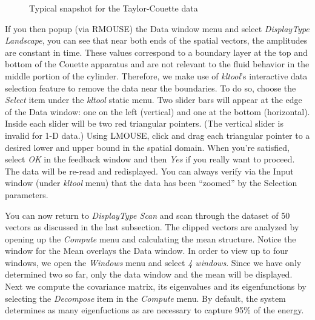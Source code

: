 \begin{figure}
\caption{Typical snapshot for the Taylor-Couette data}
\label{fig:ct}
\end{figure}

If you then popup (via RMOUSE) the Data window menu and select 
{\sl DisplayType Landscape},
you can see  that near both ends of the spatial vectors,
the amplitudes are constant in time.
These values correspond to a boundary layer at the top and 
bottom of the Couette apparatus and are
not relevant to the fluid behavior in the middle portion of the cylinder.
Therefore, we make use of {\sl kltool}'s interactive data selection feature to
remove the data near the boundaries. To do so, 
choose the {\sl Select} item under the {\sl kltool} static menu.
Two slider bars will appear
at the edge of the Data window: one on the left (vertical) and one 
at the bottom (horizontal).
Inside each slider will be two red triangular pointers.  
(The vertical slider is invalid for 1-D data.)
Using LMOUSE, click and drag each triangular pointer to a desired
lower and upper bound in the spatial domain.  When you're satisfied, select
{\sl OK} in the feedback window and then {\sl Yes}
if you really want to proceed.
The data will be re-read and redisplayed.  You can always verify via the
Input window (under {\sl kltool} menu) that the data has been ``zoomed'' by
the Selection parameters.

You can now return to {\sl DisplayType Scan} and
scan through the dataset of 50 vectors as discussed in the last subsection.
The clipped vectors
are analyzed by opening up the {\sl Compute} menu and calculating the
mean structure.  Notice the window for the Mean overlays the Data window.
In order to view up to four windows, we open the {\sl Windows} menu and select
{\sl 4 windows}. Since we have only determined two so far, only the data
window and the mean will be displayed.  Next we compute the covariance matrix,
its eigenvalues and its eigenfunctions by selecting the {\sl Decompose}
item in the {\sl Compute} menu.  By default, the system determines as many
eigenfuctions as are necessary to capture 95\% of the energy. 

